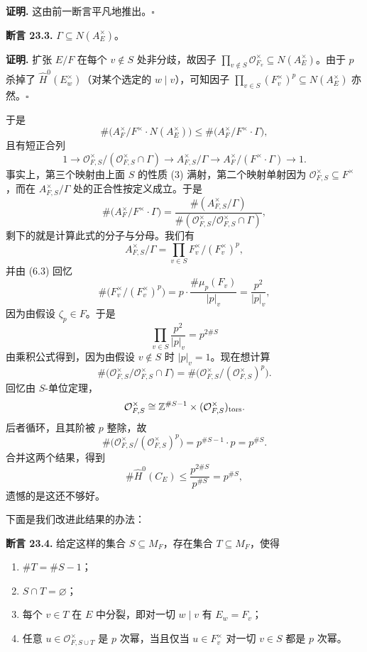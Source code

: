 \textbf{证明.} 这由前一断言平凡地推出。\hfill$\square$

\textbf{断言 23.3.} $\Gamma\subseteq N(A_E^\times)$。

\textbf{证明.} 扩张 $E/F$ 在每个 $v\notin S$ 处非分歧，故因子 $\prod_{v\notin S}\mathcal{O}_{F_v}^\times\subseteq N(A_E^\times)$。由于 $p$ 杀掉了 $\widehat H^0(E_w^\times)$（对某个选定的 $w\mid v$），可知因子 $\prod_{v\in S}(F_v^\times)^p\subseteq N(A_E^\times)$ 亦然。\hfill$\square$

于是
\[
\#\bigl(A_F^\times/F^\times\cdot N(A_E^\times)\bigr)\le\#\bigl(A_F^\times/F^\times\cdot\Gamma\bigr),
\]
且有短正合列
\[
1\to\mathcal{O}_{F,S}^\times/(\mathcal{O}_{F,S}^\times\cap\Gamma)\to A_{F,S}^\times/\Gamma\to A_F^\times/(F^\times\cdot\Gamma)\to 1.
\]
事实上，第三个映射由上面 $S$ 的性质 (3) 满射，第二个映射单射因为 $\mathcal{O}_{F,S}^\times\subseteq F^\times$，而在 $A_{F,S}^\times/\Gamma$ 处的正合性按定义成立。于是
\[
\#\bigl(A_F^\times/F^\times\cdot\Gamma\bigr)=\frac{\#(A_{F,S}^\times/\Gamma)}{\#(\mathcal{O}_{F,S}^\times/\mathcal{O}_{F,S}^\times\cap\Gamma)},
\]
剩下的就是计算此式的分子与分母。我们有
\[
A_{F,S}^\times/\Gamma=\prod_{v\in S}F_v^\times/(F_v^\times)^p,
\]
并由 (6.3) 回忆
\[
\#\bigl(F_v^\times/(F_v^\times)^p\bigr)=p\cdot\frac{\#\mu_p(F_v)}{|p|_v}=\frac{p^2}{|p|_v},
\]
因为由假设 $\zeta_p\in F$。于是
\[
\prod_{v\in S}\frac{p^2}{|p|_v}=p^{2\#S}
\]
由乘积公式得到，因为由假设 $v\notin S$ 时 $|p|_v=1$。现在想计算
\[
\#\bigl(\mathcal{O}_{F,S}^\times/\mathcal{O}_{F,S}^\times\cap\Gamma\bigr)=\#\bigl(\mathcal{O}_{F,S}^\times/(\mathcal{O}_{F,S}^\times)^p\bigr).
\]
回忆由 $S$-单位定理，
\[
\mathcal{O}_{F,S}^\times\cong\mathbb{Z}^{\#S-1}\times(\mathcal{O}_{F,S}^\times)_{\mathrm{tors}}.
\]
后者循环，且其阶被 $p$ 整除，故
\[
\#\bigl(\mathcal{O}_{F,S}^\times/(\mathcal{O}_{F,S}^\times)^p\bigr)=p^{\#S-1}\cdot p=p^{\#S}.
\]
合并这两个结果，得到
\[
\#\widehat H^0(C_E)\le\frac{p^{2\#S}}{p^{\#S}}=p^{\#S},
\]
遗憾的是这还不够好。

下面是我们改进此结果的办法：

\textbf{断言 23.4.} 给定这样的集合 $S\subseteq M_F$，存在集合 $T\subseteq M_F$，使得
\begin{enumerate}[label=(\arabic*),leftmargin=2.4em]
\item $\#T=\#S-1$；
\item $S\cap T=\varnothing$；
\item 每个 $v\in T$ 在 $E$ 中分裂，即对一切 $w\mid v$ 有 $E_w=F_v$；
\item 任意 $u\in\mathcal{O}_{F,S\cup T}^\times$ 是 $p$ 次幂，当且仅当 $u\in F_v^\times$ 对一切 $v\in S$ 都是 $p$ 次幂。
\end{enumerate}


